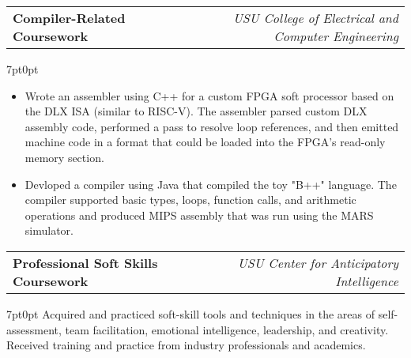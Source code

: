\documentclass[letterpaper,12pt]{article}
\makeatletter
\newcommand{\simpleHeading}[2]{
    \vspace{-1pt}
    \begin{tabular*}{0.99\textwidth}[t]{l@{\extracolsep{\fill}}r}
        #1 & #2 \\
    \end{tabular*}
}
\newcommand{\simpleParagraph}[1]{
    \vspace{-1pt}
    \begin{adjustwidth}{7pt}{0pt}
        #1
    \end{adjustwidth}
}
\makeatother
\begin{document}

    

    
    \vspace{10pt}
    \simpleHeading{\textbf{Compiler-Related Coursework}}{\textit{USU College of Electrical and Computer Engineering}}

    \simpleParagraph{
        \begin{itemize}
            \item Wrote an assembler using C++ for a custom FPGA soft processor based on the DLX ISA (similar
                to RISC-V). The assembler parsed custom DLX assembly code, performed a pass to resolve
                loop references, and then emitted machine code in a format that could be loaded into the FPGA's 
                read-only memory section.

            \item Devloped a compiler using Java that compiled the toy "B++" language. The compiler supported basic 
                types, loops, function calls, and arithmetic operations and produced MIPS assembly that
                was run using the MARS simulator.

        \end{itemize}
    }
    
    \vspace{10pt}
    \simpleHeading{\textbf{Professional Soft Skills Coursework}}{\textit{USU Center for Anticipatory Intelligence}}

    \simpleParagraph{Acquired and practiced soft-skill tools and techniques in the areas of self-assessment, team
    facilitation, emotional intelligence, leadership, and creativity. Received training and practice
    from industry professionals and academics.}
    
\end{document}
